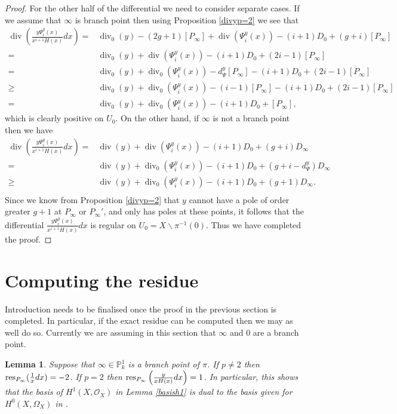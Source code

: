 \documentclass[draft, 11pt]{article} %
\theoremstyle{plain}
\newtheorem{lem}[defn]{Lemma}
\theoremstyle{remark}
\newcommand{\hzero}{{H^0(X,\Omega_X)}}
\newcommand{\hone}{H^1(X,\mathcal{O}_X)}
\DeclareMathOperator{\di}{div}
\begin{document}
\begin{proof}
For the other half of the differential we need to consider separate cases.
If we assume that $\infty$ is branch point then  using Proposition \ref{divyp=2} we see that
\begin{align*}
\di\left(\frac{y\Psi_i^y(x) }{x^{i+1}H(x)}dx \right)  =  & \di_0(y) - (2g+1)[P_\infty] + \di(\Psi_i^y(x)) - (i+1)D_0 + (g+i)[P_\infty] \\
 =  & \di_0(y) + \di(\Psi_i^y(x)) -(i+1)D_0 + (2i -1)[P_\infty] \\
 = &  \di_0(y) + \di_0(\Psi_i^y(x)) - d_\Psi^y[P_\infty] - (i+1)D_0 + (2i-1)[P_\infty] \\
 \geq &  \di_0(y) + \di_0(\Psi_i^y(x)) -(i-1)[P_\infty] -(i+1)D_0 + (2i-1)[P_\infty] \\
 =   &\di_0(y) + \di_0(\Psi_i^y(x)) -(i+1)D_0 + [P_\infty],
\end{align*}
which is clearly positive on $U_0$.
On the other hand, if $\infty$ is not a branch point then we have
\begin{align*}
\di\left(\frac{y\Psi_i^y(x) }{x^{i+1}H(x)}dx \right)  =  & \di(y) + \di(\Psi_i^y(x)) - (i+1)D_0 + (g+i)D_\infty \\
= & \di(y) + \di_0(\Psi_i^y(x)) - (i+1)D_0 + (g+i - d_\Psi^y)D_\infty \\
\geq & \di(y) + \di_0(\Psi_i^y(x)) - (i+1)D_0 + (g+1)D_\infty. \\
\end{align*}
Since we know from Proposition \ref{divyp=2} that $y$ cannot have a pole of order greater $g+1$ at $P_\infty$ or $P_\infty'$, and only has poles at these points, it follows that the differential $\frac{y\Psi_i^y(x) }{x^{i+1}H(x)}dx$ is regular on $U_0 = X \backslash \pi^{-1}(0)$.
Thus we have completed the proof.


\end{proof}

\section{Computing the residue}

Introduction needs to be finalised once the proof in the previous section is completed.
In particular, if the exact residue can be computed then we may as well do so.
Currently we are assuming in this section that $\infty$ and 0 are a branch point.

\begin{lem}
Suppose that $\infty\in \mathbb P_k^1$ is a branch point of $\pi$.
If $p \neq 2$ then ${\rm res}_{P_\infty}(\frac{1}{x}dx) = -2$.
If $p=2$ then ${\rm res}_{P_\infty}\left(\frac{y}{xH(x)}dx\right) = 1$.
In particular, this shows that the basis of $\hone$ in Lemma \ref{basish1} is dual to the basis given for $\hzero$ in \cite{faithfulaction}.
\end{lem}
\end{document}
